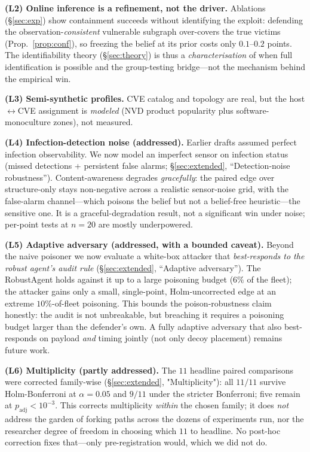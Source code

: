 \documentclass[11pt]{article}
\begin{document}
\textbf{(L2) Online inference is a refinement, not the driver.} Ablations
(\S\ref{sec:exp}) show containment succeeds without identifying the exploit:
defending the observation-\emph{consistent} vulnerable subgraph over-covers the
true victims (Prop.~\ref{prop:conf}), so freezing the belief at its prior costs
only $0.1$--$0.2$ points. The identifiability theory (\S\ref{sec:theory}) is thus
a \emph{characterisation} of when full identification is possible and the
group-testing bridge---not the mechanism behind the empirical win.

\textbf{(L3) Semi-synthetic profiles.} CVE catalog and topology are real, but the
host$\leftrightarrow$CVE assignment is \emph{modeled} (NVD product popularity plus
software-monoculture zones), not measured.

\textbf{(L4) Infection-detection noise (addressed).} Earlier drafts assumed
perfect infection observability. We now model an imperfect sensor on infection
status (missed detections + persistent false alarms; \S\ref{sec:extended},
``Detection-noise robustness''). Content-awareness degrades \emph{gracefully}:
the paired edge over structure-only stays non-negative across a realistic
sensor-noise grid, with the false-alarm channel---which poisons the belief but
not a belief-free heuristic---the sensitive one. It is a graceful-degradation
result, not a significant win under noise; per-point tests at $n{=}20$ are
mostly underpowered.

\textbf{(L5) Adaptive adversary (addressed, with a bounded caveat).} Beyond the
naive poisoner we now evaluate a white-box attacker that \emph{best-responds to
the robust agent's audit rule} (\S\ref{sec:extended}, ``Adaptive adversary'').
The RobustAgent holds against it up to a large poisoning budget ($6\%$ of the
fleet); the attacker gains only a small, single-point, Holm-uncorrected edge at
an extreme $10\%$-of-fleet poisoning. This bounds the poison-robustness claim
honestly: the audit is not unbreakable, but breaching it requires a poisoning
budget larger than the defender's own. A fully adaptive adversary that also
best-responds on payload \emph{and} timing jointly (not only decoy placement)
remains future work.

\textbf{(L6) Multiplicity (partly addressed).} The $11$ headline paired
comparisons were corrected family-wise (\S\ref{sec:extended}, "Multiplicity"):
all $11/11$ survive Holm-Bonferroni at $\alpha{=}0.05$ and $9/11$ under the
stricter Bonferroni; five remain at $p_\text{adj}\!<\!10^{-3}$. This corrects
multiplicity \emph{within} the chosen family; it does \emph{not} address the
garden of forking paths across the dozens of experiments run, nor the researcher
degree of freedom in choosing which $11$ to headline. No post-hoc correction
fixes that---only pre-registration would, which we did not do.
\end{document}
